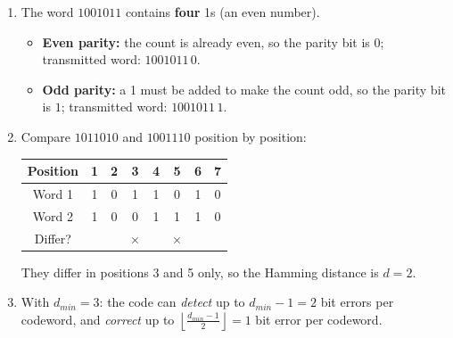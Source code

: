 \documentclass[11pt]{article}
\begin{document}
\begin{corrige}
\begin{enumerate}
\item The word $1001011$ contains \textbf{four} 1s (an even number).
\begin{itemize}
\item \textbf{Even parity:} the count is already even, so the parity bit is $\boxed{0}$; transmitted word: $1001011\,0$.
\item \textbf{Odd parity:} a 1 must be added to make the count odd, so the parity bit is $\boxed{1}$; transmitted word: $1001011\,1$.
\end{itemize}
\item Compare $1011010$ and $1001110$ position by position:
\begin{center}
\begin{tabular}{|c|ccccccc|}
\hline
\rowcolor{popblueL} Position & 1 & 2 & 3 & 4 & 5 & 6 & 7 \\
\hline
Word 1 & 1 & 0 & 1 & 1 & 0 & 1 & 0 \\
\hline
Word 2 & 1 & 0 & 0 & 1 & 1 & 1 & 0 \\
\hline
Differ? & & & $\times$ & & $\times$ & & \\
\hline
\end{tabular}
\end{center}
They differ in positions 3 and 5 only, so the Hamming distance is $\boxed{d = 2}$.
\item With $d_{min} = 3$: the code can \emph{detect} up to $d_{min}-1 = \boxed{2}$ bit errors per codeword, and \emph{correct} up to $\left\lfloor \frac{d_{min}-1}{2} \right\rfloor = \boxed{1}$ bit error per codeword.
\end{enumerate}
\end{corrige}
\end{document}
